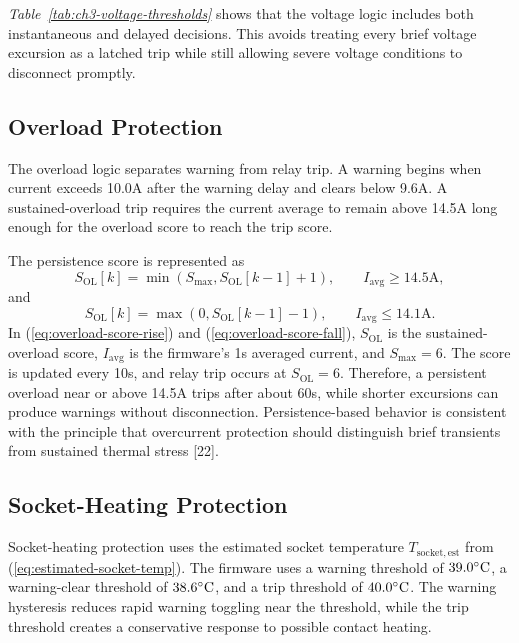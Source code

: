 \textit{Table~\ref{tab:ch3-voltage-thresholds}} shows that the voltage logic includes
both instantaneous and delayed decisions. This avoids treating every brief
voltage excursion as a latched trip while still allowing severe voltage
conditions to disconnect promptly.

\subsection{Overload Protection}
\label{sec:ch3-overload-protection}

The overload logic separates warning from relay trip. A warning begins when
current exceeds 10.0A after the warning delay and clears below 9.6A. A
sustained-overload trip requires the current average to remain above 14.5A
long enough for the overload score to reach the trip score.

The persistence score is represented as
\begin{equation}
  S_{\mathrm{OL}}[k] =
  \min\left(S_{\max}, S_{\mathrm{OL}}[k-1] + 1\right),
  \qquad I_{\mathrm{avg}}\geq 14.5\mathrm{A},
  \label{eq:overload-score-rise}
\end{equation}
and
\begin{equation}
  S_{\mathrm{OL}}[k] =
  \max\left(0, S_{\mathrm{OL}}[k-1] - 1\right),
  \qquad I_{\mathrm{avg}}\leq 14.1\mathrm{A}.
  \label{eq:overload-score-fall}
\end{equation}
In (\ref{eq:overload-score-rise}) and (\ref{eq:overload-score-fall}),
$S_{\mathrm{OL}}$ is the sustained-overload score, $I_{\mathrm{avg}}$ is the
firmware's 1s averaged current, and $S_{\max}=6$. The score is updated every
10s, and relay trip occurs at $S_{\mathrm{OL}}=6$. Therefore, a persistent
overload near or above 14.5A trips after about 60s, while shorter excursions
can produce warnings without disconnection. Persistence-based behavior is
consistent with the principle that overcurrent protection should distinguish
brief transients from sustained thermal stress [22].

\subsection{Socket-Heating Protection}
\label{sec:ch3-heating-protection}

Socket-heating protection uses the estimated socket temperature
$T_{\mathrm{socket,est}}$ from (\ref{eq:estimated-socket-temp}). The firmware
uses a warning threshold of $39.0^\circ\mathrm{C}$, a warning-clear threshold of
$38.6^\circ\mathrm{C}$, and a trip threshold of $40.0^\circ\mathrm{C}$. The warning hysteresis
reduces rapid warning toggling near the threshold, while the trip threshold
creates a conservative response to possible contact heating.

